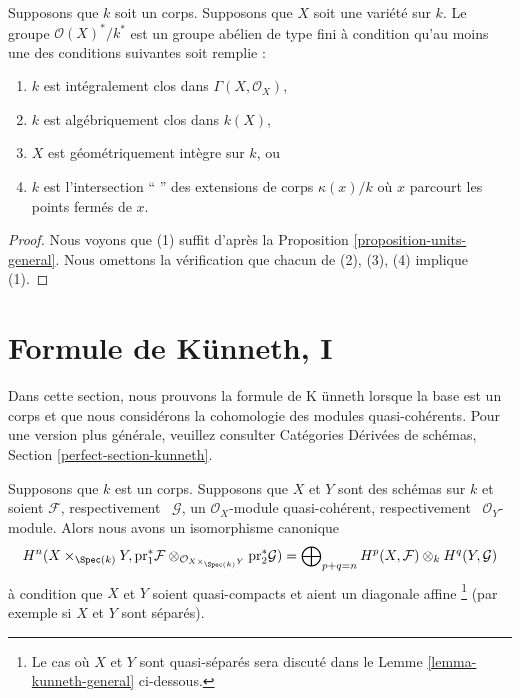 \begin{lemma}
\label{lemma-units-variety}
Supposons que $k$ soit un corps. Supposons que $X$
soit une variété sur $k$. Le groupe
$\mathcal{O}(X)^*/k^*$ est un groupe abélien de type fini à
condition qu'au moins une des conditions suivantes soit remplie :
\begin{enumerate}
\item $k$ est intégralement clos dans $\Gamma(X,
\mathcal{O}_X)$, \item $k$ est algébriquement clos dans
$k(X)$, \item $X$ est géométriquement intègre sur $k$, ou
\item $k$ est l'intersection `` '' des extensions de
corps $\kappa(x)/k$ où $x$ parcourt les points fermés de $x$.
\end{enumerate}
\end{lemma}

\begin{proof}
Nous voyons que (1) suffit d'après la Proposition
\ref{proposition-units-general}. Nous omettons la
vérification que chacun de (2), (3), (4) implique (1).
\end{proof}







\section{Formule de K\"unneth, I}
\label{section-kunneth}

\noindent
Dans cette section, nous prouvons la formule de K \" unneth lorsque
la base est un corps et que nous considérons la cohomologie des
modules quasi-cohérents. Pour une version plus générale, veuillez
consulter Catégories Dérivées de schémas, Section \ref{perfect-section-kunneth}.

\begin{lemma}
\label{lemma-kunneth}
Supposons que $k$ est un corps. Supposons que $X$ et $Y$ sont des
schémas sur $k$ et soient $\mathcal{F}$, respectivement \
$\mathcal{G}$, un $\mathcal{O}_X$-module quasi-cohérent,
respectivement \ $\mathcal{O}_Y$-module. Alors nous avons un isomorphisme canonique
$$
H^n(X \times_{\Spec(k)} Y, \text{pr}_1^*\mathcal{F}
\otimes_{\mathcal{O}_{X \times_{\Spec(k)} Y}} \text{pr}_2^*\mathcal{G}) =
\bigoplus\nolimits_{p + q = n}
H^p(X, \mathcal{F}) \otimes_k H^q(Y, \mathcal{G})
$$
à condition que $X$ et $Y$ soient quasi-compacts et aient un
diagonale affine \footnote { Le cas où $X$ et $Y$ sont
quasi-séparés sera discuté dans le Lemme
\ref{lemma-kunneth-general} ci-dessous. } (par exemple si $X$ et $Y$ sont séparés).
\end{lemma}

